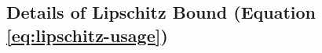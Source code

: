 \subsection{Details of Lipschitz Bound (Equation \ref{eq:lipschitz-usage})}
\label{sec:lipschitz-details}
